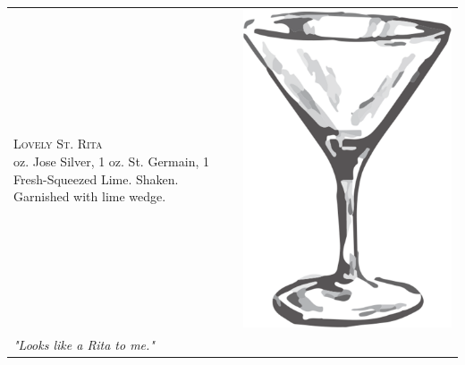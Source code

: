 \documentclass{article}
\begin{document}
\begin{tabular}{*{2}{m{}}}
{\raggedleft\huge\textsc{Lovely St. Rita}\\*}
\raggedleft 2 oz. Jose Silver, 1 oz. St. Germain, 1 Fresh-Squeezed Lime. Shaken.  Garnished with lime wedge. & \includegraphics{goblet.png}\\
\raggedleft\small\textit{"Looks like a Rita to me."}
\end{tabular}
\end{document}

